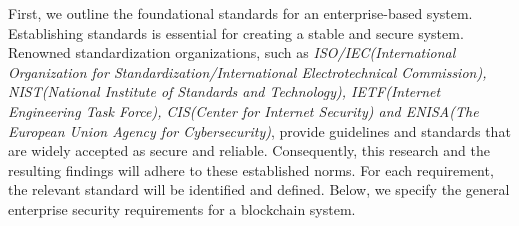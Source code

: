First, we outline the foundational standards for an enterprise-based system. Establishing standards is essential for creating a stable and secure system. Renowned standardization organizations, such as \textit{ISO/IEC(International Organization for Standardization/International Electrotechnical Commission)\cite{iso_std}\cite{iec_std}, NIST(National Institute of Standards and Technology)\cite{nist_std}, IETF(Internet Engineering Task Force)\cite{ietf_std}, CIS(Center for Internet Security)\cite{cis_std} and ENISA(The European Union Agency for Cybersecurity)\cite{enisa_std}}, provide guidelines and standards that are widely accepted as secure and reliable. Consequently, this research and the resulting findings will adhere to these established norms. For each requirement, the relevant standard will be identified and defined. Below, we specify the general enterprise security requirements for a blockchain system.

